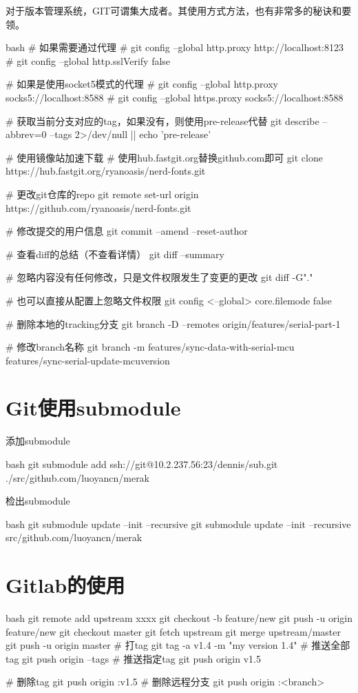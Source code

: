 对于版本管理系统，GIT可谓集大成者。其使用方式方法，也有非常多的秘诀和要领。
\begin{code-block}{bash}
# 如果需要通过代理
# git config --global http.proxy http://localhost:8123
# git config --global http.sslVerify false

# 如果是使用socket5模式的代理
# git config --global http.proxy socks5://localhost:8588
# git config --global https.proxy socks5://localhost:8588

# 获取当前分支对应的tag，如果没有，则使用pre-release代替
git describe --abbrev=0 --tags 2>/dev/null || echo 'pre-release'

# 使用镜像站加速下载
# 使用hub.fastgit.org替换github.com即可
git clone https://hub.fastgit.org/ryanoasis/nerd-fonts.git

# 更改git仓库的repo
git remote set-url origin https://github.com/ryanoasis/nerd-fonts.git

# 修改提交的用户信息
git commit --amend --reset-author

# 查看diff的总结（不查看详情）
git diff --summary

# 忽略内容没有任何修改，只是文件权限发生了变更的更改
git diff -G"."

# 也可以直接从配置上忽略文件权限
git config <--global> core.filemode false

# 删除本地的tracking分支
git branch -D --remotes origin/features/serial-part-1

# 修改branch名称
git branch -m features/sync-data-with-serial-mcu features/sync-serial-update-mcuversion
\end{code-block}

\section{Git使用submodule}
添加submodule
\begin{code-block}{bash}
git submodule add ssh://git@10.2.237.56:23/dennis/sub.git ./src/github.com/luoyancn/merak
\end{code-block}
检出submodule
\begin{code-block}{bash}
git submodule update --init --recursive
git submodule update --init --recursive src/github.com/luoyancn/merak
\end{code-block}

\section{Gitlab的使用}
\begin{code-block}{bash}
git remote add upstream xxxx
git checkout -b feature/new
git push -u origin feature/new
git checkout master
git fetch upstream
git merge upstream/master
git push -u origin master
# 打tag
git tag -a v1.4 -m "my version 1.4"
# 推送全部tag
git push origin --tags
# 推送指定tag
git push origin v1.5

# 删除tag
git push origin :v1.5
# 删除远程分支
git push origin :<branch>
\end{code-block}

